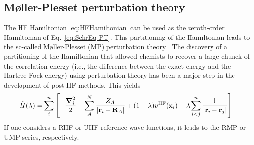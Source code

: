 \documentclass[11pt,a4paper]{article}
\newcommand{\hH}{\Hat{H}}
\newcommand{\bH}{\mathbf{H}}
\begin{document}



\subsection{M{\o}ller-Plesset perturbation theory}

The HF Hamiltonian \eqref{eq:HFHamiltonian} can be used as the zeroth-order Hamiltonian of Eq.~\eqref{eq:SchrEq-PT}. This partitioning of the Hamiltonian leads to the so-called M{\o}ller-Plesset (MP) perturbation theory \cite{Moller_1934}. The discovery of a partitioning of the Hamiltonian that allowed chemists to recover a large chunck of the correlation energy (i.e., the difference between the exact energy and the Hartree-Fock energy) using perturbation theory has been a major step in the development of post-HF methods. This yields
\begin{equation}\label{eq:MPHamiltonian}
    \hH(\lambda) = 
    \sum_{i}^{n} \qty[ 
    -\frac{\grad_i^2}{2} 
    - \sum_{A}^{N} \frac{Z_A}{\abs{\vb{r}_i-\vb{R}_A}} 
    + (1-\lambda) v^{\text{HF}}(\vb{x}_i) 
    + \lambda\sum_{i<j}^{n}\frac{1}{\abs{\vb{r}_i-\vb{r}_j}} 
    ].
\end{equation}
If one considers a RHF or UHF reference wave functions, it leads to the RMP or UMP series, respectively.
\end{document}
